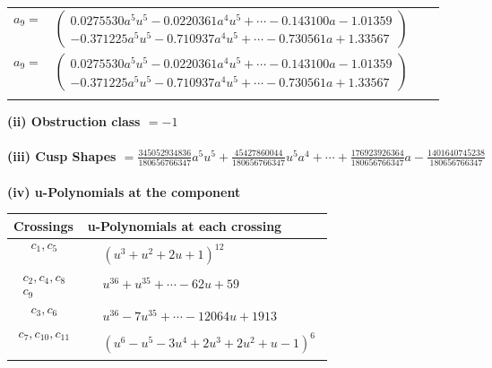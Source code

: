 \documentclass[1p]{elsarticle_modified}
\theoremstyle{definition}
\begin{document}
\begin{tabular}{m{7pt} m{180pt} m{7pt} m{180pt} }
\flushright $a_{9}=$&$\begin{pmatrix}0.0275530 a^{5} u^{5}-0.0220361 a^{4} u^{5}+\cdots-0.143100 a-1.01359\\-0.371225 a^{5} u^{5}-0.710937 a^{4} u^{5}+\cdots-0.730561 a+1.33567\end{pmatrix}$\\ \flushright $a_{9}=$&$\begin{pmatrix}0.0275530 a^{5} u^{5}-0.0220361 a^{4} u^{5}+\cdots-0.143100 a-1.01359\\-0.371225 a^{5} u^{5}-0.710937 a^{4} u^{5}+\cdots-0.730561 a+1.33567\end{pmatrix}$\\&\end{tabular}
\flushleft \textbf{(ii) Obstruction class $= -1$}\\~\\
\flushleft \textbf{(iii) Cusp Shapes $= \frac{345052934836}{180656766347} a^5 u^5+\frac{45427860044}{180656766347} u^5 a^4+\cdots+\frac{176923926364}{180656766347} a-\frac{1401640745238}{180656766347}$}\\~\\
\newpage\renewcommand{\arraystretch}{1}
\flushleft \textbf{(iv) u-Polynomials at the component}\newline \\
\begin{tabular}{m{50pt}|m{274pt}}
Crossings & \hspace{64pt}u-Polynomials at each crossing \\
\hline $$\begin{aligned}c_{1},c_{5}\end{aligned}$$&$\begin{aligned}
&(u^3+u^2+2 u+1)^{12}
\end{aligned}$\\
\hline $$\begin{aligned}c_{2},c_{4},c_{8}\\c_{9}\end{aligned}$$&$\begin{aligned}
&u^{36}+u^{35}+\cdots-62 u+59
\end{aligned}$\\
\hline $$\begin{aligned}c_{3},c_{6}\end{aligned}$$&$\begin{aligned}
&u^{36}-7 u^{35}+\cdots-12064 u+1913
\end{aligned}$\\
\hline $$\begin{aligned}c_{7},c_{10},c_{11}\end{aligned}$$&$\begin{aligned}
&(u^6- u^5-3 u^4+2 u^3+2 u^2+u-1)^6
\end{aligned}$\\
\hline
\end{tabular}\\~\\
\end{document}
